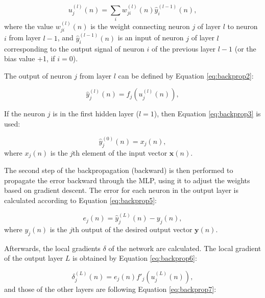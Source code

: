 \begin{equation}
\label{eq:backprop1}
    u_j^{(l)}(n) = \sum_i w_{ji}^{(l)}(n) \hat{y}_i^{(l-1)}(n),
\end{equation}
where the value $w_{ji}^{(l)}(n)$ is the weight connecting neuron $j$ of layer $l$ to neuron $i$ from layer $l-1$, and
$\hat{y}_i^{(l-1)}(n)$ is an input of neuron $j$ of layer $l$ corresponding to the output signal of neuron $i$ of the previous layer $l-1$ (or the bias value +1, if $i=0$).

The output of neuron $j$ from layer $l$ can be defined by Equation \ref{eq:backprop2}:

\begin{equation}
\label{eq:backprop2}
    \hat{y}_j^{(l)}(n) = f_j (u_j^{(l)} (n) ),
\end{equation}

If the neuron $j$ is in the first hidden layer ($l = 1$), then Equation \ref{eq:backprop3} is used:

\begin{equation}
    \label{eq:backprop3}
    \hat{y}_j^{(0)}(n) = x_j (n),
\end{equation}
where $x_j(n)$ is the $j$th element of the input vector $\mathbf{x}(n)$. 

%

The second step of the backpropagation (backward) is then performed to propagate the error backward through the MLP, using it to adjust the weights based on gradient descent. The error for each neuron in the output layer is calculated according to Equation \ref{eq:backprop5}: 

\begin{equation}
    \label{eq:backprop5}
    e_j (n) = \hat{y}^{(L)}_j(n) - y_j (n),
\end{equation}
where $y_j (n)$ is the $j$th output of the desired output vector $\mathbf{y}(n)$.

Afterwards, the local gradients $\delta$ of the network are calculated. The local gradient of the output layer $L$ is obtained by Equation \ref{eq:backprop6}:

\begin{equation}
    \label{eq:backprop6}
    \delta_j^{(L)} (n) = e_j(n) {f}'_j (u_j^{(L)}(n)),
\end{equation}
and those of the other layers are following Equation \ref{eq:backprop7}:

